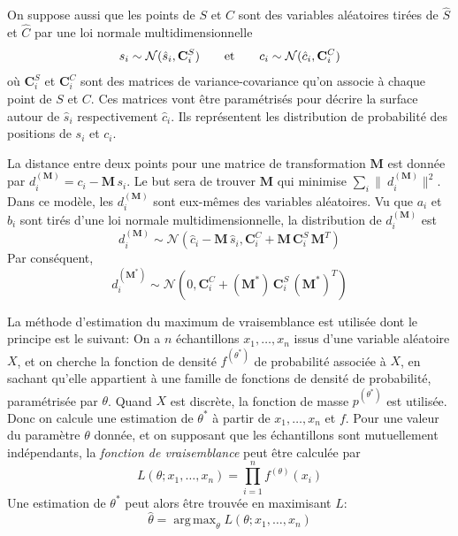 \documentclass[a4paper,10pt]{scrreprt}
\DeclareMathOperator*{\argmax}{arg\,max}
\begin{document}
On suppose aussi que les points de $S$ et $C$ sont des variables aléatoires tirées de $\hat{S}$ et $\hat{C}$ par une loi normale multidimensionnelle
\begin{equation*}
	s_i \sim \mathcal{N}(\hat{s}_i, \mathbf{C}^S_i)
	\hspace{7mm} \text{et} \hspace{7mm}
	c_i \sim \mathcal{N}(\hat{c}_i, \mathbf{C}^C_i)
\end{equation*}
où $\mathbf{C}^S_i$ et $\mathbf{C}^C_i$ sont des matrices de variance-covariance qu'on associe à chaque point de $S$ et $C$. Ces matrices vont être paramétrisés pour décrire la surface autour de $\hat{s}_i$ respectivement $\hat{c}_i$. Ils représentent les distribution de probabilité des positions de $s_i$ et $c_i$.

La distance entre deux points pour une matrice de transformation $\mathbf{M}$ est donnée par $d^{(\mathbf{M})}_i = c_i - \mathbf{M} \, s_i$. Le but sera de trouver $\mathbf{M}$ qui minimise $\sum_{i} \|\ d^{(\mathbf{M})}_i \|^2$. Dans ce modèle, les $d^{(\mathbf{M})}_i$ sont eux-mêmes des variables aléatoires. Vu que $a_i$ et $b_i$ sont tirés d'une loi normale multidimensionnelle, la distribution de $d^{(\mathbf{M})}_i$ est
\begin{equation*} \label{eq:dist_distr}
	d^{(\mathbf{M})}_i \sim \mathcal{N}(\hat{c}_i - \mathbf{M}\,\hat{s}_i, \mathbf{C}^C_i + \mathbf{M}\,\mathbf{C}^S_i\,\mathbf{M}^T)
\end{equation*}
Par conséquent,
\begin{equation*}
	d^{(\mathbf{M}^*)}_i \sim \mathcal{N}(0, \mathbf{C}^C_i + (\mathbf{M}^*)\,\mathbf{C}^S_i\,(\mathbf{M}^*)^T)
\end{equation*}

La méthode d'estimation du maximum de vraisemblance est utilisée dont le principe est le suivant: On a $n$ échantillons $x_1, \ldots, x_n$ issus d'une variable aléatoire $X$, et on cherche la fonction de densité $f^{(\theta^*)}$ de probabilité associée à $X$, en sachant qu'elle appartient à une famille de fonctions de densité de probabilité, paramétrisée par $\theta$. Quand $X$ est discrète, la fonction de masse $p^{(\theta^*)}$ est utilisée. Donc on calcule une estimation de $\theta^*$ à partir de $x_1, \ldots, x_n$ et $f$. Pour une valeur du paramètre $\theta$ donnée, et on supposant que les échantillons sont mutuellement indépendants, la \emph{fonction de vraisemblance} peut être calculée par
\begin{equation*}
	L(\theta; x_1, \ldots, x_n) = \prod_{i=1}^{n} f^{(\theta)}(x_i)
\end{equation*}
Une estimation de $\theta^*$ peut alors être trouvée en maximisant $L$:
\begin{equation*}
	\hat{\theta} = \argmax_{\theta} L(\theta; x_1, \ldots, x_n)
\end{equation*}
\end{document}

